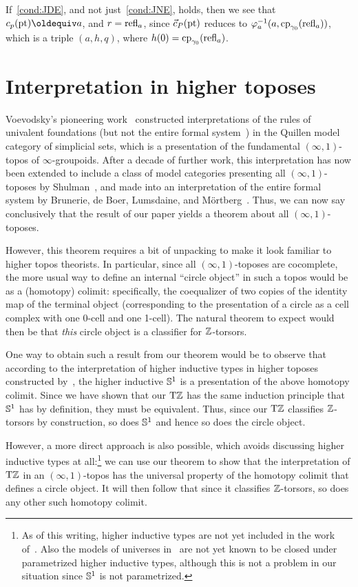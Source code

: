 \documentclass[a4paper,12pt]{amsart}
\begin{document}
If~\cref{cond:JDE}, and not just~\cref{cond:JNE}, holds,
then we see that $c_p(\pt)\jdeq a$, and $r=\mathop{{\mathrm{refl}}_{a}}$,
since $\vec c_P({\mathord{\mathrm{pt}}})$ reduces to
$\varphi_{a}^{-1}(a,\mathrm{cp}_{\gamma_0}(\mathop{{\mathrm{refl}}_{a}}))$,
which is a triple $(a,h,q)$, where $h(0)=\mathrm{cp}_{\gamma_0}(\mathop{{\mathrm{refl}}_{a}})$.

\section{Interpretation in higher toposes}
\label{sec:topos}

Voevodsky's pioneering work~\cite{1211.2851} constructed interpretations of the rules of univalent foundations (but not the entire formal system~\cite{voevodsky:not-interp}) in the Quillen model category of simplicial sets, which is a presentation of the fundamental $(\infty,1)$-topos of $\infty$-groupoids.
After a decade of further work, this interpretation has now been extended to include a class of model categories presenting all $(\infty,1)$-toposes by Shulman~\cite{shulman:univinj}, and made into an interpretation of the entire formal system by Brunerie, de Boer, Lumsdaine, and M\"{o}rtberg~\cite{initiality}.
Thus, we can now say conclusively that the result of our paper yields a theorem about all $(\infty,1)$-toposes.

However, this theorem requires a bit of unpacking to make it look familiar to higher topos theorists.
In particular, since all $(\infty,1)$-toposes are cocomplete, the more usual way to define an internal ``circle object'' in such a topos would be as a (homotopy) colimit: specifically, the coequalizer of two copies of the identity map of the terminal object (corresponding to the presentation of a circle as a cell complex with one 0-cell and one 1-cell).
The natural theorem to expect would then be that \emph{this} circle object is a classifier for $\mathbb{Z}$-torsors.

One way to obtain such a result from our theorem would be to observe that according to the interpretation of higher inductive types in higher toposes constructed by~\cite{1705.07088}, the higher inductive ${\mathbb{S}^1}$ is a presentation of the above homotopy colimit.
Since we have shown that our ${\mathrm{T}\mathbb{Z}}$ has the same induction principle that ${\mathbb{S}^1}$ has by definition, they must be equivalent.
Thus, since our ${\mathrm{T}\mathbb{Z}}$ classifies $\mathbb{Z}$-torsors by construction, so does ${\mathbb{S}^1}$ and hence so does the circle object.

However, a more direct approach is also possible, which avoids discussing higher inductive types at all:\footnote{As of this writing, higher inductive types are not yet included in the work of~\cite{initiality}.  Also the models of universes in~\cite{shulman:univinj} are not yet known to be closed under parametrized higher inductive types, although this is not a problem in our situation since ${\mathbb{S}^1}$ is not parametrized.} we can use our theorem to show that the interpretation of ${\mathrm{T}\mathbb{Z}}$ in an $(\infty,1)$-topos has the universal property of the homotopy colimit that defines a circle object.
It will then follow that since it classifies $\mathbb{Z}$-torsors, so does any other such homotopy colimit.
\end{document}

